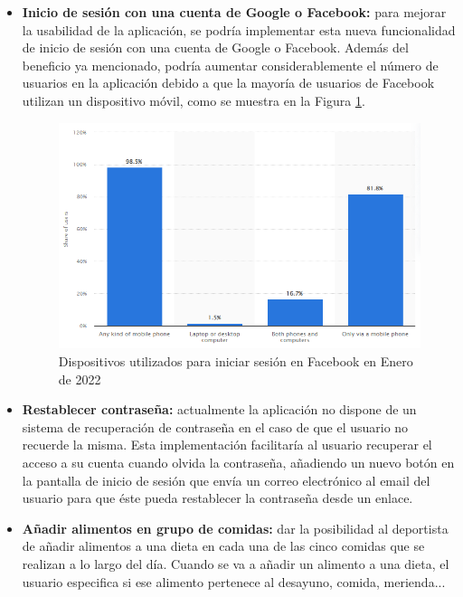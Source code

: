 \begin{itemize}
    \item \textbf{Inicio de sesión con una cuenta de Google o Facebook:} para mejorar la usabilidad de la aplicación, se podría implementar esta nueva funcionalidad de inicio de sesión con una cuenta de Google o Facebook. Además del beneficio ya mencionado, podría aumentar considerablemente el número de usuarios en la aplicación debido a que la mayoría de usuarios de Facebook utilizan un dispositivo móvil, como se muestra en la Figura \ref{fig:fb_users}.
    \begin{figure}[H]
        \centering
        \includegraphics[width=\textwidth]{Images/Capitulo9/fbUsers.png}
        \caption{Dispositivos utilizados para iniciar sesión en Facebook en Enero de 2022 \cite{mobile_max_users}}
        \label{fig:fb_users}
    \end{figure}
    
    \item \textbf{Restablecer contraseña:} actualmente la aplicación no dispone de un sistema de recuperación de contraseña en el caso de que el usuario no recuerde la misma. Esta implementación facilitaría al usuario recuperar el acceso a su cuenta cuando olvida la contraseña, añadiendo un nuevo botón en la pantalla de inicio de sesión que envía un correo electrónico al email del usuario para que éste pueda restablecer la contraseña desde un enlace.
    
    \item \textbf{Añadir alimentos en grupo de comidas:} dar la posibilidad al deportista de añadir alimentos a una dieta en cada una de las cinco comidas que se realizan a lo largo del día. Cuando se va a añadir un alimento a una dieta, el usuario especifica si ese alimento pertenece al desayuno, comida, merienda...
    

\end{itemize}
